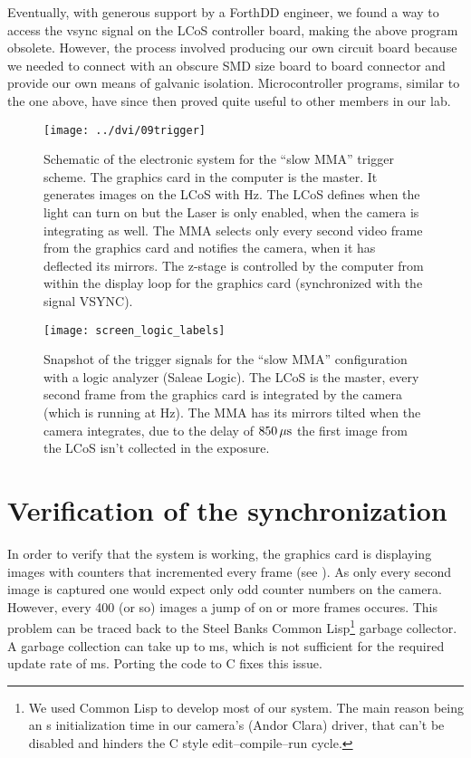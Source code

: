 Eventually, with generous support by a ForthDD engineer, we found a
way to access the vsync signal on the LCoS controller board, making
the above program obsolete. However, the process involved producing
our own circuit board because we needed to connect with an obscure SMD
size board to board connector and provide our own means of galvanic
isolation. Microcontroller programs, similar to the one above, have
since then proved quite useful to other members in our lab. 


\begin{figure}[!hbt]
  \centering
  \texttt{[image: ../dvi/09trigger]}
  \caption{Schematic of the electronic system for the ``slow MMA''
    trigger scheme. The graphics card in the computer is the
    master. It generates images on the LCoS with \unit[60]{Hz}. The
    LCoS defines when the light can turn on but the Laser is only
    enabled, when the camera is integrating as well. The MMA selects
    only every second video frame from the graphics card and notifies
    the camera, when it has deflected its mirrors. The z-stage is controlled by the computer from within the display loop for the graphics card (synchronized with the signal \textsf{VSYNC}).  }
  \label{fig:09trigger}
\end{figure}



\begin{figure}[!hbt]
  \centering
  \texttt{[image: screen\_logic\_labels]}
  \caption{Snapshot of the trigger signals for the ``slow MMA''
    configuration with a logic analyzer (Saleae Logic). The LCoS is
    the master, every second frame from the graphics card is
    integrated by the camera (which is running at \unit[30]{Hz}). The
    MMA has its mirrors tilted when the camera integrates, due to the
    delay of $\unit[850]{\mu s}$ the first image from the LCoS isn't
    collected in the exposure.}
  \label{fig:screen_logic_labels}
\end{figure}

\section{Verification of the synchronization}
In order to verify that the system is working, the graphics card is
displaying images with counters that incremented every frame (see
). As only every second image is
captured one would expect only odd counter numbers on the
camera. However, every 400 (or so) images a jump of on or more frames
occures. This problem can be traced back to the Steel Banks Common
Lisp\footnote{We used Common Lisp to develop most of our system. The
  main reason being an \unit[8]{s} initialization time in our camera's
  (Andor Clara) driver, that can't be disabled and hinders the C style
  edit--compile--run cycle.} garbage collector. A garbage collection
can take up to \unit[80]{ms}, which is not sufficient for the required
update rate of \unit[16]{ms}. Porting the code to C fixes this issue.

